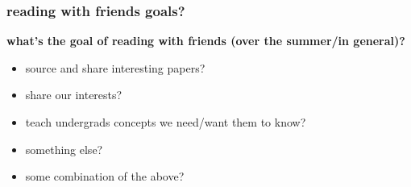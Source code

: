 \documentclass[presentation]{subfiles}
\begin{document}
\begin{frame}\frametitle{reading with friends goals?}

\textbf{\large what's the \alert{goal} of reading with friends (over the {summer}/in general)?}

\begin{itemize}
  \item source and share interesting papers?
  \item share our interests?
  \item teach undergrads concepts we need/want them to know?
  \item something else?
  \item some combination of the above?
\end{itemize}

\end{frame}
\end{document}
